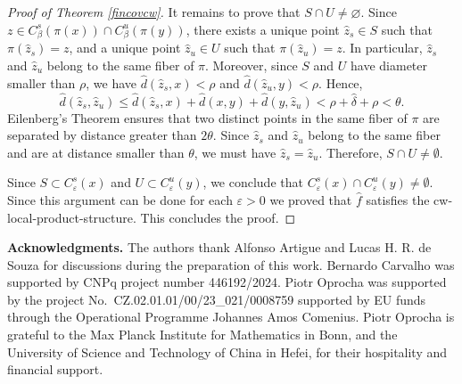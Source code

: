 \documentclass{amsart}
\theoremstyle{plain}
\theoremstyle{definition}
\newcommand{\eps}{\varepsilon}
\begin{document}
\begin{proof}[Proof of Theorem \ref{fincovcw}]
It remains to prove that $S\cap U\neq\varnothing$. Since $z\in C^s_\beta(\pi(x))\cap C^u_\beta(\pi(y))$, there exists a unique point $\widehat z_s\in S$ such that $\pi(\widehat z_s)=z$, and a unique point $\widehat z_u\in U$ such that $\pi(\widehat z_u)=z$. In particular, $\widehat z_s$ and $\widehat z_u$ belong to the same fiber of $\pi$. Moreover, since $S$ and $U$ have diameter smaller than $\rho$, we have $\widehat d(\widehat z_s,x)<\rho$ and $\widehat d(\widehat z_u,y)<\rho$. Hence,
$$\widehat d(\widehat z_s,\widehat z_u)\leq \widehat d(\widehat z_s,x)+\widehat d(x,y)+\widehat d(y,\widehat z_u)<\rho+\widehat\delta+\rho<\theta.$$
Eilenberg's Theorem ensures that two distinct points in the same fiber of $\pi$ are separated by distance greater than $2\theta$. Since $\widehat z_s$ and $\widehat z_u$ belong to the same fiber and are at distance smaller than $\theta$, we must have $\widehat z_s=\widehat z_u$. Therefore, $S\cap U\neq\emptyset$.

Since $S\subset C^s_\varepsilon(x)$ and $U\subset C^u_\varepsilon(y)$, we conclude that
$C^s_\varepsilon(x)\cap C^u_\varepsilon(y)\neq\emptyset$. Since this argument can be done for each $\eps>0$ we proved that $\widehat f$ satisfies the cw-local-product-structure. This concludes the proof.
\end{proof}


\vspace{+0.2cm}

\hspace{-0.4cm}\textbf{Acknowledgments.}
The authors thank Alfonso Artigue and Lucas H. R. de Souza for discussions during the preparation of this work. Bernardo Carvalho was supported by CNPq project number 446192/2024. 
Piotr Oprocha was supported by the project No.~CZ.02.01.01/00/23\_021/0008759 supported by EU funds through the Operational Programme Johannes Amos Comenius.
Piotr Oprocha is grateful to the Max Planck Institute for Mathematics in Bonn, and the University of Science and Technology of China in Hefei, for their hospitality and financial support. 
\end{document}
